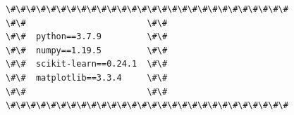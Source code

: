 \documentclass[11pt, twoside]{article}
\begin{document}
    \begin{Verbatim}[commandchars=\\\{\}]
\#\#\#\#\#\#\#\#\#\#\#\#\#\#\#\#\#\#\#\#\#\#\#\#\#\#\#\#
\#\#                        \#\#
\#\#  python==3.7.9         \#\#
\#\#  numpy==1.19.5         \#\#
\#\#  scikit-learn==0.24.1  \#\#
\#\#  matplotlib==3.3.4     \#\#
\#\#                        \#\#
\#\#\#\#\#\#\#\#\#\#\#\#\#\#\#\#\#\#\#\#\#\#\#\#\#\#\#\#
    \end{Verbatim}


    
    
    
\end{document}
